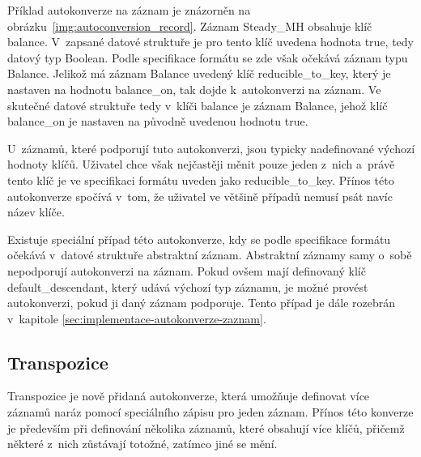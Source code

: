 \documentclass[FM,bw,DP]{tulthesis}
\begin{document}
Příklad autokonverze na záznam je znázorněn na obrázku~\ref{img:autoconversion_record}. Záznam Steady\_MH obsahuje klíč balance. V~zapsané datové struktuře je pro tento klíč uvedena hodnota true, tedy datový typ Boolean. Podle specifikace formátu se zde však očekává záznam typu Balance. Jelikož má záznam Balance uvedený klíč reducible\_to\_key, který je nastaven na hodnotu balance\_on, tak dojde k~autokonverzi na záznam. Ve skutečné datové struktuře tedy v~klíči balance je záznam Balance, jehož klíč balance\_on je nastaven na původně uvedenou hodnotu true.

U~záznamů, které podporují tuto autokonverzi, jsou typicky nadefinované výchozí hodnoty klíčů. Uživatel chce však nejčastěji měnit pouze jeden z~nich a~právě tento klíč je ve specifikaci formátu uveden jako reducible\_to\_key. Přínos této autokonverze spočívá v~tom, že uživatel ve většině případů nemusí psát navíc název klíče.

Existuje speciální případ této autokonverze, kdy se podle specifikace formátu očekává v~datové struktuře abstraktní záznam. Abstraktní záznamy samy o~sobě nepodporují autokonverzi na záznam. Pokud ovšem mají definovaný klíč default\_de\-scend\-ant, který udává výchozí typ záznamu, je možné provést autokonverzi, pokud ji daný záznam podporuje. Tento případ je dále rozebrán v~kapitole \ref{sec:implementace-autokonverze-zaznam}.

\subsection{Transpozice}
Transpozice je nově přidaná autokonverze, která umožňuje definovat více záznamů naráz pomocí speciálního zápisu pro jeden záznam. Přínos této konverze je především při definování několika záznamů, které obsahují více klíčů, přičemž některé z~nich zůstávají totožné, zatímco jiné se mění.
\end{document}
